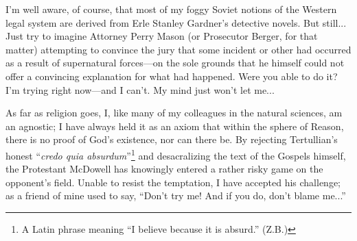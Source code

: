 I'm well aware, of course, that most of my foggy Soviet notions of the Western legal system are derived from Erle Stanley Gardner's detective novels. But still... Just try to imagine Attorney Perry Mason (or Prosecutor Berger, for that matter) attempting to convince the jury that some incident or other had occurred as a result of supernatural forces---on the sole grounds that he himself could not offer a convincing explanation for what had happened. Were you able to do it? I'm trying right now---and I can't. My mind just won't let me...

As far as religion goes, I, like many of my colleagues in the natural sciences, am an agnostic; I have always held it as an axiom that within the sphere of Reason, there is no proof of God's existence, nor can there be. By rejecting Tertullian's honest ``\emph{credo quia absurdum}''\footnote{A Latin phrase meaning ``I believe because it is absurd.'' (Z.B.)} and desacralizing the text of the Gospels himself, the Protestant McDowell has knowingly entered a rather risky game on the opponent's field. Unable to resist the temptation, I have accepted his challenge; as a friend of mine used to say, ``Don't try me! And if you do, don't blame me...''